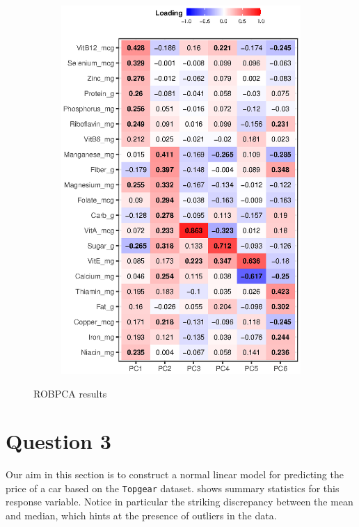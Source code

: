 \documentclass[titlepage]{article}
\begin{document}
\begin{landscape}
\begin{figure}
\begin{minipage}{0.5\linewidth}
    \end{minipage}
    \begin{subfigure}{0.5\linewidth}
      \centering
      \includegraphics{q2-loadings}
      \label{fig:q2-loadings}
    \end{subfigure}
    \caption{ROBPCA results}
  \end{figure}
\end{landscape}
\restoregeometry

\section*{Question 3}

Our aim in this section is to construct a normal linear model for predicting the price of a car based on the \texttt{Topgear} dataset.  shows summary statistics for this response variable. Notice in particular the striking discrepancy between the mean and median, which hints at the presence of outliers in the data.
\end{document}
